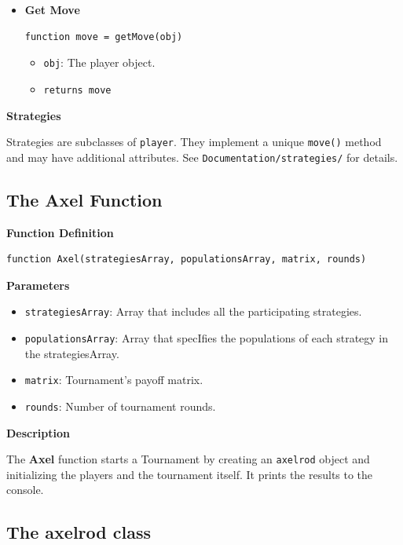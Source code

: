 \documentclass[12pt]{report}
\begin{document}
\begin{itemize}
  \item \textbf{Get Move}
  \begin{verbatim}
function move = getMove(obj)
  \end{verbatim}
  \begin{itemize}
    \item \texttt{obj}: The player object.
    \item \texttt{returns move}
  \end{itemize}
\end{itemize}

\bigskip

\textbf{Strategies}

Strategies are subclasses of \texttt{player}. They implement a unique \texttt{move()} method and may have additional attributes. See \texttt{Documentation/strategies/} for details.



\newpage
\subsection{The Axel Function}

\textbf{Function Definition}
\begin{verbatim}
function Axel(strategiesArray, populationsArray, matrix, rounds)
\end{verbatim}

\bigskip

\textbf{Parameters}
\begin{itemize}
  \item \texttt{strategiesArray}: Array that includes all the participating strategies.
  \item \texttt{populationsArray}: Array that specIfies the populations of each strategy in the strategiesArray.
  \item \texttt{matrix}: Tournament's payoff matrix.
  \item \texttt{rounds}: Number of tournament rounds.
\end{itemize}

\bigskip

\textbf{Description}

The \textbf{Axel} function starts a Tournament by creating an \texttt{axelrod} object and initializing the players and the tournament itself. It prints the results to the console.
\newpage
\subsection{The axelrod class}
\end{document}
